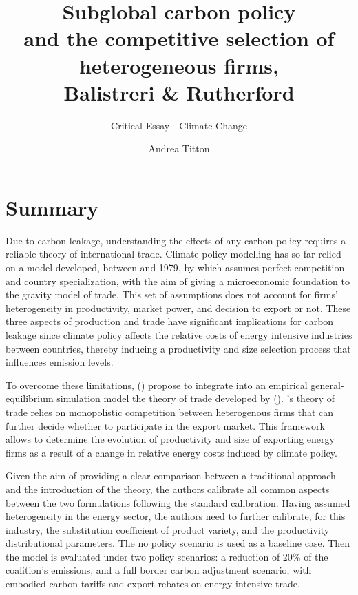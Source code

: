 \documentclass[american]{scrartcl}
\title{Subglobal carbon policy \\ and the competitive selection of heterogeneous firms, \\ Balistreri \& Rutherford}
\subtitle{Critical Essay - Climate Change}
\author{Andrea Titton}
\newcommand{\citein}[1]{\citeauthor{#1} (\citeyear{#1})}
\begin{document}
\maketitle

\section{Summary}

Due to carbon leakage, understanding the effects of any carbon policy requires a reliable theory of international trade. Climate-policy modelling has so far relied on a model developed, between \citeyear{Armington1969} and 1979, by \citeauthor{Armington1969} which assumes perfect competition and country specialization, with the aim of giving a microeconomic foundation to the gravity model of trade. This set of assumptions does not account for firms' heterogeneity in productivity, market power, and decision to export or not. These three aspects of production and trade have significant implications for carbon leakage since climate policy affects the relative costs of energy intensive industries between countries, thereby inducing a productivity and size selection process that influences emission levels.

To overcome these limitations, \citein{Balistreri2012} propose to integrate into an empirical general-equilibrium simulation model the theory of trade developed by \citein{Melitz2003}. \citeauthor{Melitz2003}'s theory of trade relies on monopolistic competition between heterogenous firms that can further decide whether to participate in the export market. This framework allows to determine the evolution of productivity and size of exporting energy firms as a result of a change in relative energy costs induced by climate policy.

Given the aim of providing a clear comparison between a traditional \citeauthor{Armington1969} approach and the introduction of the \citeauthor{Melitz2003} theory, the authors calibrate all common aspects between the two formulations following the standard \citeauthor{Armington1969} calibration. Having assumed heterogeneity in the energy sector, the authors need to further calibrate, for this industry, the substitution coefficient of product variety, and the productivity distributional parameters. The no policy scenario is used as a baseline case. Then the model is evaluated under two policy scenarios: a reduction of 20\% of the coalition's emissions, and a full border carbon adjustment scenario,  with embodied-carbon tariffs and export rebates on energy intensive trade.
\end{document}
